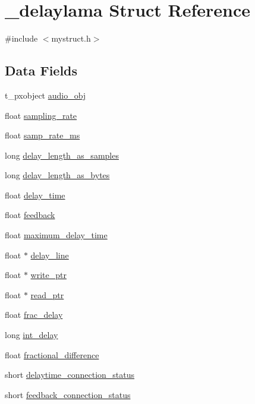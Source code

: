 \hypertarget{struct__delaylama}{}\section{\+\_\+delaylama Struct Reference}
\label{struct__delaylama}


{\ttfamily \#include $<$mystruct.\+h$>$}

\subsection*{Data Fields}
\begin{DoxyCompactItemize}
\item 
t\+\_\+pxobject \mbox{\hyperlink{struct__delaylama_ad47adfc434607131779df86168e93012}{audio\+\_\+obj}}
\item 
float \mbox{\hyperlink{struct__delaylama_a8d632437c1878f0244e942c89b3b99f9}{sampling\+\_\+rate}}
\item 
float \mbox{\hyperlink{struct__delaylama_ad06216daf396171bc5906c9385caf5a9}{samp\+\_\+rate\+\_\+ms}}
\item 
long \mbox{\hyperlink{struct__delaylama_a6a5854827becb6ccf5a1b21e2f05d416}{delay\+\_\+length\+\_\+as\+\_\+samples}}
\item 
long \mbox{\hyperlink{struct__delaylama_af132a243c2bf892bffb8b807f082a583}{delay\+\_\+length\+\_\+as\+\_\+bytes}}
\item 
float \mbox{\hyperlink{struct__delaylama_a94508f45102f3baabfe745b83ff532a8}{delay\+\_\+time}}
\item 
float \mbox{\hyperlink{struct__delaylama_af5751b04978c100c5e39d3d7edb2e147}{feedback}}
\item 
float \mbox{\hyperlink{struct__delaylama_a8ba3bc6edcb6cd4f1f2df78776585103}{maximum\+\_\+delay\+\_\+time}}
\item 
float $\ast$ \mbox{\hyperlink{struct__delaylama_a7f52f1f2e55bed198ee82896e6fae790}{delay\+\_\+line}}
\item 
float $\ast$ \mbox{\hyperlink{struct__delaylama_ac202512892d631747b5ef0c98de0367b}{write\+\_\+ptr}}
\item 
float $\ast$ \mbox{\hyperlink{struct__delaylama_a29e64edb7b6a1dd7dfb1532de8fdd3c5}{read\+\_\+ptr}}
\item 
float \mbox{\hyperlink{struct__delaylama_a880cf71a52e8ff524ec622ed151c1060}{frac\+\_\+delay}}
\item 
long \mbox{\hyperlink{struct__delaylama_aee4739857c84c525e1cc4bde2109fed9}{int\+\_\+delay}}
\item 
float \mbox{\hyperlink{struct__delaylama_aa7370036df80c7562d96feb416e2595a}{fractional\+\_\+difference}}
\item 
short \mbox{\hyperlink{struct__delaylama_a00ecf1a566cefc76250b5b577a1fdc50}{delaytime\+\_\+connection\+\_\+status}}
\item 
short \mbox{\hyperlink{struct__delaylama_a14bd8c5cb09591ae98849fc5c2e4da5d}{feedback\+\_\+connection\+\_\+status}}
\end{DoxyCompactItemize}


